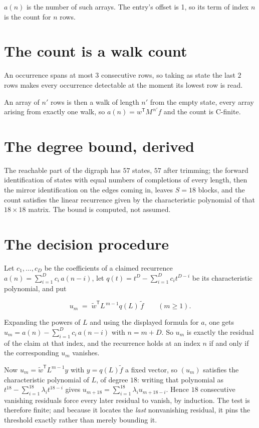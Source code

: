 \documentclass[11pt]{article}
\theoremstyle{definition}
\begin{document}
$a(n)$ is the number of such arrays. The entry's offset is 1, so its term of index $n$ is the count for $n$ rows.

\section{The count is a walk count}

An occurrence spans at most $3$ consecutive rows, so taking as state the last $2$ rows makes every occurrence detectable at the moment its lowest row is read.

An array of $n'$ rows is then a walk of length $n'$ from the empty state, every array arising from exactly one walk, so $a(n) = w^{\mathsf T}M^{\,n'}f$ and the count is C-finite.

\section{The degree bound, derived}

The reachable part of the digraph has $57$ states, $57$ after trimming; the forward identification of states with equal numbers of completions of every length, then the mirror identification on the edges coming in, leaves $S = 18$ blocks, and the count satisfies the linear recurrence given by the characteristic polynomial of that $18\times18$ matrix. The bound is computed, not assumed.

\section{The decision procedure}

Let $c_1,\dots,c_D$ be the coefficients of a claimed recurrence $a(n) = \sum_{i=1}^{D} c_i\,a(n-i)$, let $q(t) = t^{D} - \sum_{i=1}^{D} c_i t^{D-i}$ be its characteristic polynomial, and put

\[u_m \;=\; \tilde w^{\mathsf T} L^{\,m-1} q(L)\,\tilde f \qquad (m \ge 1).\]

Expanding the powers of $L$ and using the displayed formula for $a$, one gets $u_m = a(n) - \sum_{i=1}^{D} c_i\,a(n-i)$ with $n = m + D$. So $u_m$ is exactly the residual of the claim at that index, and the recurrence holds at an index $n$ if and only if the corresponding $u_m$ vanishes.

Now $u_m = \tilde w^{\mathsf T} L^{m-1} y$ with $y = q(L)\tilde f$ a fixed vector, so $(u_m)$ satisfies the characteristic polynomial of $L$, of degree $18$: writing that polynomial as $t^{18} - \sum_{i=1}^{18} \lambda_i t^{18-i}$ gives $u_{m+18} = \sum_{i=1}^{18} \lambda_i u_{m+18-i}$. Hence $18$ consecutive vanishing residuals force every later residual to vanish, by induction. The test is therefore finite; and because it locates the {\itshape last} nonvanishing residual, it pins the threshold exactly rather than merely bounding it.
\end{document}
